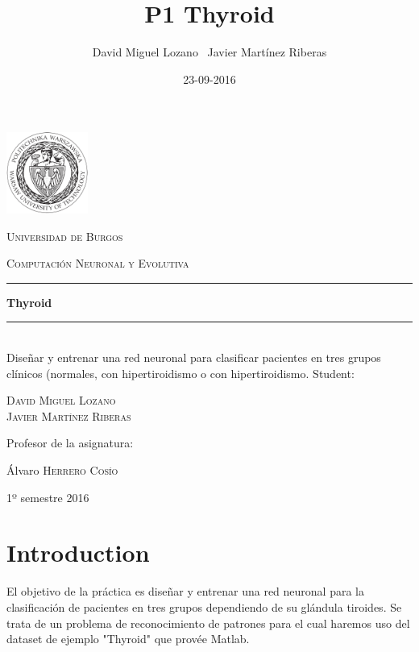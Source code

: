 \documentclass[a4paper,12pt,titlepage]{article}
\newcommand{\HRule}[1]{\rule{\linewidth}{#1}}
\begin{document}
\author{David Miguel Lozano \ Javier Martínez Riberas}
\title{P1 Thyroid}
\date{23-09-2016}

\begin{titlepage}
	\centering
	\includegraphics[width=0.2\textwidth]{images/pw-logo.png}\par
	\vspace{0.3cm}
	{\scshape\LARGE Universidad de Burgos \par}
	\vfill
	{\scshape\Large Computación Neuronal y Evolutiva \par}
	\HRule{2pt}
	{\huge\bfseries Thyroid \par}
	\HRule{2pt}
	\\ [0.5cm]
	{Diseñar y entrenar una red neuronal para clasificar pacientes en tres grupos clínicos (normales, con hipertiroidismo o con hipertiroidismo.}
	\vfill
	Student:\par
	{\Large\scshape David Miguel Lozano \\ Javier Martínez Riberas \par}
	\vfill
	Profesor de la asignatura:\par
	Álvaro \textsc{Herrero Cosío}
	\vfill
	{\large 1º semestre 2016 \par}
\end{titlepage}

\newpage
\tableofcontents
\begin{appendix}
  \listoffigures
\end{appendix}

\newpage

\section{Introduction}

El objetivo de la práctica es diseñar y entrenar una red neuronal para la clasificación de pacientes en tres grupos dependiendo de su glándula tiroides. Se trata de un problema de reconocimiento de patrones para el cual haremos uso del dataset de ejemplo "Thyroid" que provée Matlab.
\end{document}
